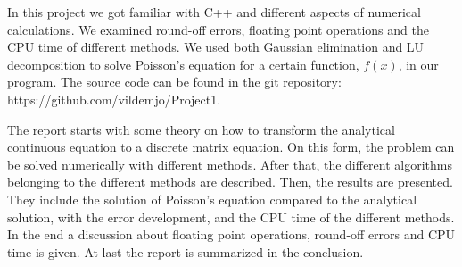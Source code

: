 In this project we got familiar with C++ and different aspects of numerical calculations. We examined round-off errors, floating point operations and the CPU time of different methods. We used both Gaussian elimination and LU decomposition to solve Poisson's equation for a certain function, $f(x)$, in our program. The source code can be found in the git repository:\\ https://github.com/vildemjo/Project1.

The report starts with some theory on how to transform the analytical continuous equation to a discrete matrix equation. On this form, the problem can be solved numerically with different methods. After that, the different algorithms belonging to the different methods are described. Then, the results are presented. They include the solution of Poisson's equation compared to the analytical solution, with the error development, and the CPU time of the different methods. In the end a discussion about floating point operations, round-off errors and CPU time is given. At last the report is summarized in the conclusion.